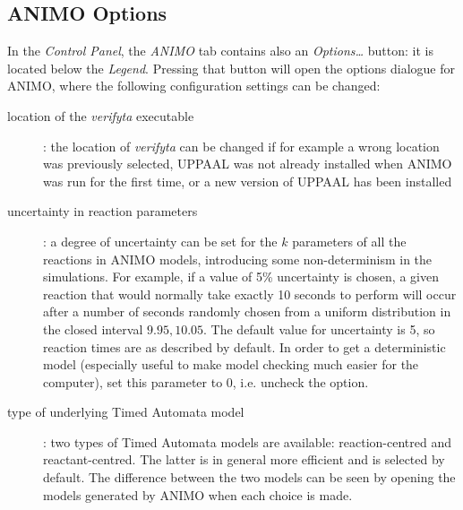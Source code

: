 \documentclass{article}
\begin{document}
\subsection{ANIMO Options}\label{sec:animo-options}
In the \emph{Control Panel}, the \emph{ANIMO} tab contains also an \emph{Options\dots} button:
it is located below the \emph{Legend}. Pressing that button will open the options dialogue for
ANIMO, where the following configuration settings can be changed:
\begin{description}
  \item[location of the \emph{verifyta} executable]: the location of \emph{verifyta}
    can be changed if for example a wrong location was previously selected,
    UPPAAL was not already installed when ANIMO was run for the first time, or a new
    version of UPPAAL has been installed
  \item[uncertainty in reaction parameters]: a degree of uncertainty can be set for the
    $k$ parameters of all the reactions in ANIMO models, introducing some non-determinism
    in the simulations. For example, if a value of 5\% uncertainty is chosen, a given reaction
    that would normally take exactly 10 seconds to perform will occur after a number of
    seconds randomly chosen from a uniform distribution in the closed interval $9.95, 10.05$.
    The default value for uncertainty is 5, so reaction times are as described by default.
    In order to get a deterministic model (especially useful to make model checking much
    easier for the computer), set this parameter to 0, i.e. uncheck the option.
  \item[type of underlying Timed Automata model]: two types of Timed Automata models are
    available: reaction-centred and reactant-centred. The latter is in general more efficient
    and is selected by default. The difference between the two models can be seen by opening
    the models generated by ANIMO when each choice is made.
\end{description}
\end{document}
